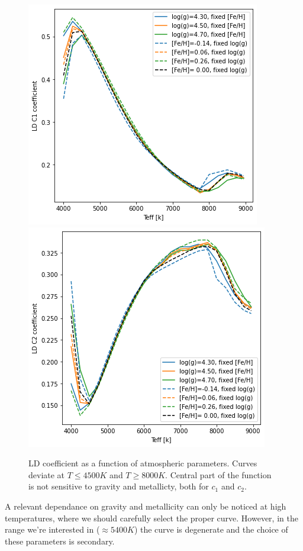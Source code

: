 \documentclass[a4paper,11pt,twocolumn]{article}
\begin{document}
\begin{figure}[H]
    \centering  
    \includegraphics[scale=0.5, angle=0]{../pictures/Claret2017/2017_c1}
    \includegraphics[scale=0.5, angle=0]{../pictures/Claret2017/2017_c2}
    \caption{LD coefficient as a function of atmospheric parameters. Curves 
    deviate at $T\leq 4500K$ and $T\geq 8000K$. Central part of the 
    function is not sensitive to gravity and metallicty, both for $c_1$ 
    and $c_2$.}
\end{figure}
A relevant dependance on gravity and metallicity can only be noticed at 
high temperatures, where we should carefully select the proper curve. However,
in the range we're interested in ($\approx 5400 K$) the curve is 
degenerate and the choice of these parameters is secondary.
\end{document}
